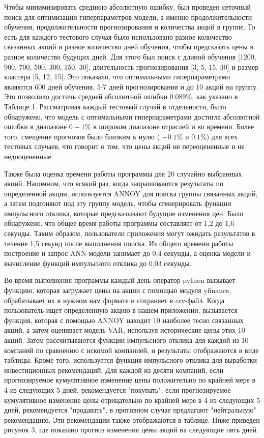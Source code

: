 {Чтобы минимизировать среднюю абсолютную ошибку, был проведен сеточный
поиск для оптимизации гиперпараметров модели, а именно продолжительности
обучения, продолжительности прогнозирования и количества акций в группе.
То есть для каждого тестового случая было использовано разное количество
связанных акций и разное количество дней обучения, чтобы предсказать
цены в разное количество будущих дней. Для этого был поиск с длиной
обучения {[}1200, 900, 700, 500, 300, 150, 30{]}, длительность
прогнозирования {[}3, 5, 15, 30{]} и размер кластера {[}5, 12, 15{]}.
Это показало, что оптимальными гиперпараметрами являются 600 дней
обучения, 5-7 дней прогнозирования и до 10 акций на группу. Это
позволило достичь средней абсолютной ошибки 0.089\%, как указано в
Таблице 1. Рассматривая каждый тестовый случай в отдельности, было
обнаружено, что модель с оптимальными гиперпараметрами достигла
абсолютной ошибки в диапазоне \(0 - 1\text{\%}\) в широком диапазоне
отраслей и во времени. Более того, смещение прогнозов было близким к
нулю (\(\) \(- 0.1\text{\%}\) и \(0.1\text{\%}\)) для всех тестовых
случаев, что говорит о том, что цены акций не переоцененные и не
недооцененные.

Также была оценка времени работы программы для 20 случайно выбранных
акций. Напомним, что всякий раз, когда запрашиваются результаты по
определенной акции, используется ANNOY для поиска группы связанных
акций, а затем подгоняют под эту группу модель, чтобы сгенерировать
функции импульсного отклика, которые предсказывают будущие изменения
цен. Было обнаружено, что общее время работы программы составляет от 1,2
до 1,6 секунды. Таким образом, пользователи приложения могут ожидать
результатов в течение 1,5 секунд после выполнения поиска. Из общего
времени работы построение и запрос ANN-модели занимает до 0,4 секунды, а
оценка модели и вычисление функций импульсного отклика до 0,03 секунды.

Во время выполнения программы каждый день оператор python вызывает
функцию, которая загружает цены на акции с помощью модуля yfinance,
обрабатывает их в нужном нам формате и сохраняет в csv-файл. Когда
пользователь ищет определенную акцию в нашем приложении, вызывается
функция, которая с помощью ANNOY находит 10 наиболее тесно связанных
акций, а затем оценивает модель VAR, используя исторические цены этих 10
акций. Затем рассчитываются функции импульсного отклика для каждой из 10
компаний по сравнению с искомой компанией, и результаты отображаются в
виде таблицы. Кроме того, используется функция импульсного отклика для
выработки инвестиционных рекомендаций. Для каждой из десяти компаний,
если прогнозируемое кумулятивное изменение цены положительно по крайней
мере в 4 из следующих 5 дней, рекомендуется "покупать"; если
прогнозируемое кумулятивное изменение цены отрицательно по крайней мере
в 4 из следующих 5 дней, рекомендуется "продавать"; в противном случае
предлагают "нейтральную" рекомендацию. Эти рекомендации также
отображаются в таблице. Ниже приведен рисунок 3, где показано прогноз
изменения цены акций на следующие пять дней.

}
